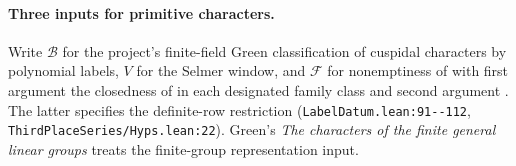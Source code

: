 \paragraph{Three inputs for primitive characters.} Write $\mathcal B$ for the project's finite-field Green classification of cuspidal characters by polynomial labels, $V$ for the Selmer window, and $\mathcal F$ for nonemptiness of  with first argument the closedness of  in each designated family class and second argument . The latter specifies the definite-row restriction (\nolinkurl{LabelDatum.lean:91--112}, \nolinkurl{ThirdPlaceSeries/Hyps.lean:22}). Green's \emph{The characters of the finite general linear groups} treats the finite-group representation input.
